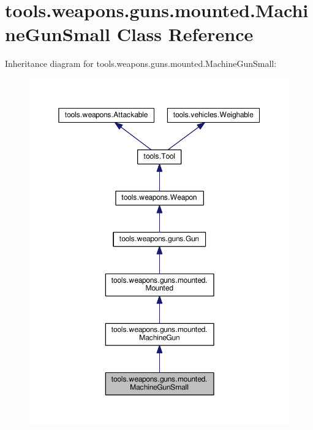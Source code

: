 \hypertarget{classtools_1_1weapons_1_1guns_1_1mounted_1_1_machine_gun_small}{}\section{tools.\+weapons.\+guns.\+mounted.\+Machine\+Gun\+Small Class Reference}
\label{classtools_1_1weapons_1_1guns_1_1mounted_1_1_machine_gun_small}


Inheritance diagram for tools.\+weapons.\+guns.\+mounted.\+Machine\+Gun\+Small\+:
\nopagebreak
\begin{figure}[H]
\begin{center}
\leavevmode
\includegraphics[width=350pt]{classtools_1_1weapons_1_1guns_1_1mounted_1_1_machine_gun_small__inherit__graph}
\end{center}
\end{figure}


